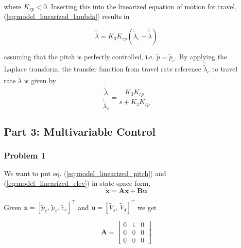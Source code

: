 where $K_{rp} < 0$. Inserting this into the linearized equation of motion for travel, (\ref{eq:model_linearized_lambda}) results in

\begin{equation}
    \ddot{\tilde \lambda} = K_3 K_{rp} (\dot{\tilde{\lambda}}_c - \dot{\tilde{\lambda}})
\end{equation}

assuming that the pitch is perfectly controlled, i.e. $\tilde{p} = \tilde{p}_c$. By applying the Laplace transform, the transfer function from travel rate reference $\dot{\tilde{\lambda}}_c$ to travel rate $\dot{\tilde{\lambda}}$ is given by
\begin{equation}
    \frac{\dot{\tilde \lambda}}{\dot{\tilde{\lambda}}_c} = \frac{K_3 K_{rp}}{s + K_3 K_{rp}}
\end{equation}





\subsection{Part 3: Multivariable Control}

\subsubsection{Problem 1}

We want to put eq. (\ref{eq:model_linearized_pitch}) and (\ref{eq:model_linearized_elev}) in state-space form, 
\begin{equation} \label{eq:state_space}
    \dot{\bm{x}} = \bm{A}\bm{x} + \bm{B}\bm{u}
\end{equation}

Given $ \bm{x} = [\tilde{p}_c,\, \dot{\tilde{p}}_c,\, \dot{\tilde e}_c]^\top$ and $\bm{u} = [\tilde V_s,\, \tilde V_d]^\top$ we get

\begin{equation} \label{eq:part3_prob1_A}
    \bm{A} = 
	\begin{bmatrix}
		0 &  1 &  0 \\
		0 &  0 &  0 \\
		0 &  0 &  0 
	\end{bmatrix}
\end{equation}

